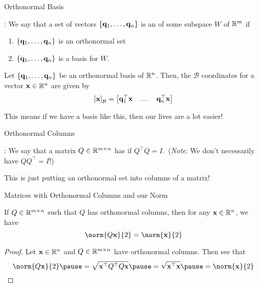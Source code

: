 \documentclass[xcoler=dvipsnames, aspectratio=169]{beamer}
\date{QR and Least Squares Problems}
\newcommand{\B}{\mathcal{B}}
\begin{document}
    \begin{frame}{Orthonormal Basis}
        \small
        \begin{defn}
            : We say that a set of vectors $\left\{\mathbf{q}_1,\dots,\mathbf{q}_n\right\}$
            is an  of some subspace $W$ of $\mathbb{R}^m$ if
            \begin{enumerate}
                \pause\item $\left\{\mathbf{q}_1,\dots,\mathbf{q}_n\right\}$ is an orthonormal set
                \pause\item $\left\{\mathbf{q}_1,\dots,\mathbf{q}_n\right\}$ is a basis for $W$.
            \end{enumerate}
        \end{defn}
        \pause
        \begin{theorem}
            Let $\left\{\mathbf{q}_1,\dots,\mathbf{q}_n\right\}$ be an orthonormal basis of $\mathbb{R}^n$. Then, 
            the $\B$ coordinates for a vector $\mathbf{x}\in\mathbb{R}^n$ are given by
            \[
                \bCoord{\vec{x}}{\B} = \bMat{\vec{q}_1^\top\vec{x} & \dots & \vec{q}_n^\top\vec{x}}
            \]\pause
        \end{theorem}
        This means if we have a basis like this, then our lives are a lot easier!
    \end{frame}
    \begin{frame}{Orthonormal Columns}
        \begin{defn}
            : We say that a matrix $Q\in\mathbb{R}^{m\times n}$ has
             if $Q^\top Q = I$.\pause\ (\emph{Note}: We don't necessarily
            have $QQ^\top=I$!)\pause
        \end{defn}
        This is just putting an orthonormal set into columns of a matrix!
    \end{frame}
    \begin{frame}{Matrices with Orthonormal Columns and our Norm}
        \begin{theorem}
            If $Q\in\mathbb{R}^{m\times n}$ such that $Q$ has orthonormal columns, then for any $\mathbf{x}\in\mathbb{R}^n$, we have
            \[
                \norm{Q\vec{x}}{2} = \norm{\vec{x}}{2}
            \]
        \end{theorem}\pause
        \begin{proof}
            Let $\mathbf{x}\in\mathbb{R}^n$ and $Q\in\mathbb{R}^{m\times n}$ have orthonormal columns. Then see that
            \[
                \norm{Q\vec{x}}{2}\pause = \sqrt{\vec{x}^\top Q^\top Q\vec{x}}
                \pause=\sqrt{\vec{x}^\top\vec{x}}\pause = \norm{\vec{x}}{2}
            \]
        \end{proof}
    \end{frame}
\end{document}
